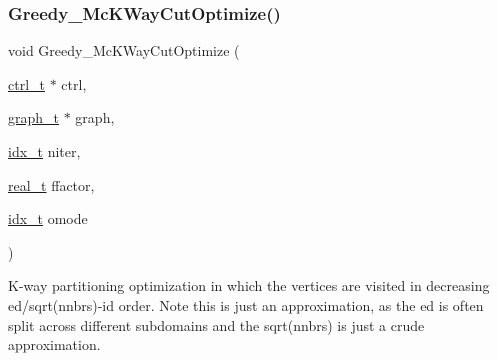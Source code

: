 \subsubsection{\texorpdfstring{Greedy\+\_\+\+Mc\+K\+Way\+Cut\+Optimize()}{Greedy\_McKWayCutOptimize()}}
{\footnotesize\ttfamily void Greedy\+\_\+\+Mc\+K\+Way\+Cut\+Optimize (\begin{DoxyParamCaption}\item[{\hyperlink{a00742}{ctrl\+\_\+t} $\ast$}]{ctrl,  }\item[{\hyperlink{a00734}{graph\+\_\+t} $\ast$}]{graph,  }\item[{\hyperlink{a00876_aaa5262be3e700770163401acb0150f52}{idx\+\_\+t}}]{niter,  }\item[{\hyperlink{a00876_a1924a4f6907cc3833213aba1f07fcbe9}{real\+\_\+t}}]{ffactor,  }\item[{\hyperlink{a00876_aaa5262be3e700770163401acb0150f52}{idx\+\_\+t}}]{omode }\end{DoxyParamCaption})}

K-\/way partitioning optimization in which the vertices are visited in decreasing ed/sqrt(nnbrs)-\/id order. Note this is just an approximation, as the ed is often split across different subdomains and the sqrt(nnbrs) is just a crude approximation.


